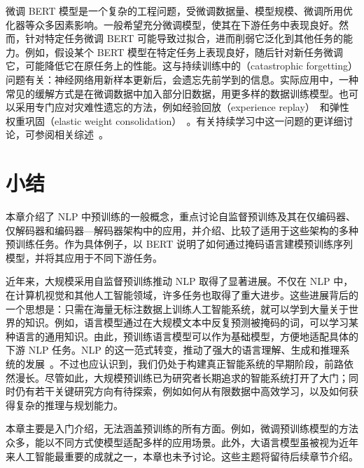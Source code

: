微调 BERT 模型是一个复杂的工程问题，受微调数据量、模型规模、微调所用优化器等众多因素影响。一般希望充分微调模型，使其在下游任务中表现良好。然而，针对特定任务微调 BERT 可能导致过拟合，进而削弱它泛化到其他任务的能力。例如，假设某个 BERT 模型在特定任务上表现良好，随后针对新任务微调它，可能降低它在原任务上的性能。这与持续训练中的（catastrophic forgetting）问题有关：神经网络用新样本更新后，会遗忘先前学到的信息。实际应用中，一种常见的缓解方式是在微调数据中加入部分旧数据，用更多样的数据训练模型。也可以采用专门应对灾难性遗忘的方法，例如经验回放（experience replay）~\cite{rolnick-etal:2019experience}和弹性权重巩固（elastic weight consolidation）~\cite{kirkpatrick-etal:2017overcoming}。有关持续学习中这一问题的更详细讨论，可参阅相关综述~\cite{parisi-etal:2019continual,wang-etal:2023comprehensive,wang-etal:2023comprehensive2}。


\section{小结}

\noindent 本章介绍了 NLP 中预训练的一般概念，重点讨论自监督预训练及其在仅编码器、仅解码器和编码器—解码器架构中的应用，并介绍、比较了适用于这些架构的多种预训练任务。作为具体例子，以 BERT 说明了如何通过掩码语言建模预训练序列模型，并将其应用于不同下游任务。

近年来，大规模采用自监督预训练推动 NLP 取得了显著进展。不仅在 NLP 中，在计算机视觉和其他人工智能领域，许多任务也取得了重大进步。这些进展背后的一个思想是：只需在海量无标注数据上训练人工智能系统，就可以学到大量关于世界的知识。例如，语言模型通过在大规模文本中反复预测被掩码的词，可以学习某种语言的通用知识。由此，预训练语言模型可以作为基础模型，方便地适配具体的下游 NLP 任务。NLP 的这一范式转变，推动了强大的语言理解、生成和推理系统的发展~\cite{manning:2022human}。不过也应认识到，我们仍处于构建真正智能系统的早期阶段，前路依然漫长。尽管如此，大规模预训练已为研究者长期追求的智能系统打开了大门；同时仍有若干关键研究方向有待探索，例如如何从有限数据中高效学习，以及如何获得复杂的推理与规划能力。

本章主要是入门介绍，无法涵盖预训练的所有方面。例如，微调预训练模型的方法众多，能以不同方式使模型适配多样的应用场景。此外，大语言模型虽被视为近年来人工智能最重要的成就之一，本章也未予讨论。这些主题将留待后续章节介绍。
